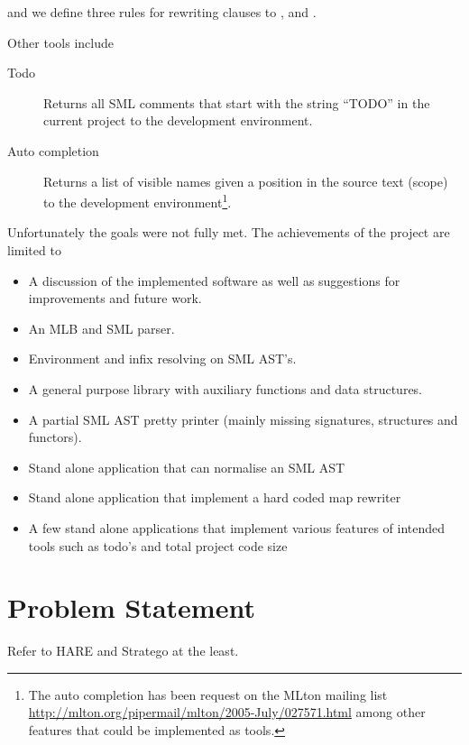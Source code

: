 \noindent
and we define three rules for rewriting clauses to ,  and .

Other tools include

\begin{description}
\item[Todo] Returns all SML comments that start with the string ``TODO'' in the
  current project to the development environment.

\item[Auto completion] Returns a list of visible names given a position in the
  source text (scope) to the development environment\footnote{The auto
    completion has been request on the MLton mailing list
    \url{http://mlton.org/pipermail/mlton/2005-July/027571.html} among other
    features that could be implemented as tools.}.
\end{description}


Unfortunately the goals were not fully met. The achievements of the project
are limited to

\begin{itemize}

\item A discussion of the implemented software as well as suggestions for
improvements and future work.
\item An MLB and SML parser. 
\item Environment and infix resolving on SML AST's.
\item A general purpose library with auxiliary functions and data structures.
\item A partial SML AST pretty printer (mainly missing signatures, structures
  and functors). 
\item Stand alone application that can normalise an SML AST
\item Stand alone application that implement a hard coded map rewriter

\item A few stand alone applications that implement various features of intended
  tools such as todo's and total project code size
\end{itemize}



\section{Problem Statement}

Refer to HARE and Stratego at the least.

